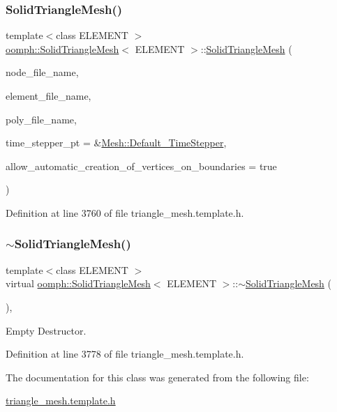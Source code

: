 \subsubsection{\texorpdfstring{Solid\+Triangle\+Mesh()}{SolidTriangleMesh()}\hspace{0.1cm}{\footnotesize\ttfamily [2/2]}}
{\footnotesize\ttfamily template$<$class E\+L\+E\+M\+E\+NT $>$ \\
\hyperlink{classoomph_1_1SolidTriangleMesh}{oomph\+::\+Solid\+Triangle\+Mesh}$<$ E\+L\+E\+M\+E\+NT $>$\+::\hyperlink{classoomph_1_1SolidTriangleMesh}{Solid\+Triangle\+Mesh} (\begin{DoxyParamCaption}\item[{const std\+::string \&}]{node\+\_\+file\+\_\+name,  }\item[{const std\+::string \&}]{element\+\_\+file\+\_\+name,  }\item[{const std\+::string \&}]{poly\+\_\+file\+\_\+name,  }\item[{\hyperlink{classoomph_1_1TimeStepper}{Time\+Stepper} $\ast$}]{time\+\_\+stepper\+\_\+pt = {\ttfamily \&\hyperlink{classoomph_1_1Mesh_a12243d0fee2b1fcee729ee5a4777ea10}{Mesh\+::\+Default\+\_\+\+Time\+Stepper}},  }\item[{const bool \&}]{allow\+\_\+automatic\+\_\+creation\+\_\+of\+\_\+vertices\+\_\+on\+\_\+boundaries = {\ttfamily true} }\end{DoxyParamCaption})\hspace{0.3cm}{\ttfamily [inline]}}



Definition at line 3760 of file triangle\+\_\+mesh.\+template.\+h.

\mbox{\label{classoomph_1_1SolidTriangleMesh_a5ab5a2ac3aee1a80fbb72b27fc929783}} 
\subsubsection{\texorpdfstring{$\sim$\+Solid\+Triangle\+Mesh()}{~SolidTriangleMesh()}}
{\footnotesize\ttfamily template$<$class E\+L\+E\+M\+E\+NT $>$ \\
virtual \hyperlink{classoomph_1_1SolidTriangleMesh}{oomph\+::\+Solid\+Triangle\+Mesh}$<$ E\+L\+E\+M\+E\+NT $>$\+::$\sim$\hyperlink{classoomph_1_1SolidTriangleMesh}{Solid\+Triangle\+Mesh} (\begin{DoxyParamCaption}{ }\end{DoxyParamCaption})\hspace{0.3cm}{\ttfamily [inline]}, {\ttfamily [virtual]}}



Empty Destructor. 



Definition at line 3778 of file triangle\+\_\+mesh.\+template.\+h.



The documentation for this class was generated from the following file\+:\begin{DoxyCompactItemize}
\item 
\hyperlink{triangle__mesh_8template_8h}{triangle\+\_\+mesh.\+template.\+h}\end{DoxyCompactItemize}
